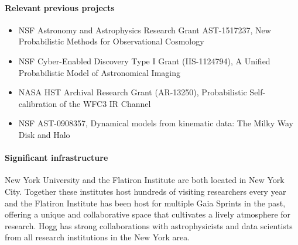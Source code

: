 \paragraph{Relevant previous projects}
\begin{itemize}
    \item NSF Astronomy and Astrophysics Research Grant AST-1517237, New Probabilistic Methods for Observational Cosmology
    \item NSF Cyber-Enabled Discovery Type I Grant (IIS-1124794), A Unified Probabilistic Model of Astronomical Imaging
    \item NASA HST Archival Research Grant (AR-13250), Probabilistic Self-calibration of the WFC3 IR Channel
    \item NSF AST-0908357, Dynamical models from kinematic data: The Milky Way Disk and Halo
\end{itemize}

\paragraph{Significant infrastructure}
New York University and the Flatiron Institute are both located in New York City. Together these institutes host hundreds of visiting researchers every year and the Flatiron Institute has been host for multiple Gaia Sprints in the past, offering a unique and collaborative space that cultivates a lively atmosphere for research.
Hogg has strong collaborations with astrophysicists and data scientists from all research institutions in the New York area.
